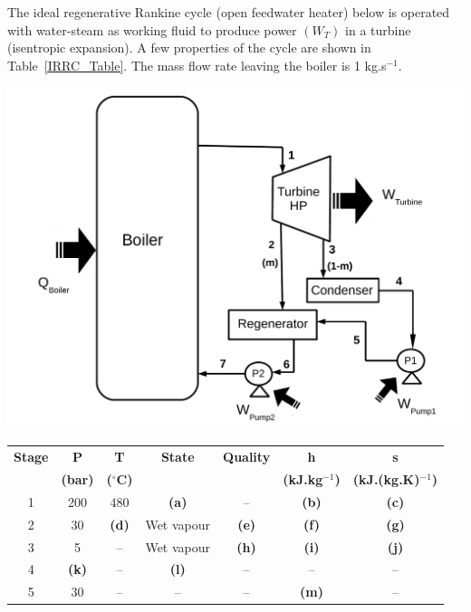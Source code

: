 \documentclass[calculator,steamtables,refrigeranttables,psychrometricchart,datasheet,resit]{exam}
\begin{document}
\begin{question}
The ideal regenerative Rankine cycle (open feedwater heater) below is operated with water-steam as working fluid to produce power $\left(W_{T}\right)$ in a turbine (isentropic expansion). A few properties of the cycle are shown in Table~\ref{IRRC_Table}. The mass flow rate leaving the boiler is 1 kg.s$^{-1}$.
      \begin{center}
      \includegraphics[width=10.cm,clip]{./Pics/Exam_Reheat_Regenerative2_Rankine_Cycle}
     \end{center} 
\begin{table}[b]
\begin{center}
\begin{tabular}{c | c c c c c c} 
\hline
{\bf Stage} & {\bf P}       & {\bf T}            &  {\bf State}  &  {\bf Quality}  & {\bf h}             & {\bf s}                  \\
            & {\bf (bar)}   & {\bf ($^{\circ}$C)} &               &                 &{\bf (kJ.kg$^{-1}$)}  & {\bf (kJ.(kg.K)$^{-1}$)}  \\
\hline
1           &  200          & 480                &  {\bf (a)}    &   --            & {\bf (b)}           & {\bf (c)}                 \\
2           &  30           & {\bf (d)}          &  Wet vapour   & {\bf (e)}       & {\bf (f)}           & {\bf (g)}                \\
3           &  5            & --                 &  Wet vapour   & {\bf (h)}       & {\bf (i)}           & {\bf (j)}                \\
4           &  {\bf (k)}    &  --                &  {\bf (l)}    & --              &   --                &   --                      \\
5           &  30           &  --                &   --          &  --             & {\bf (m)}           &  --                       \\

\end{tabular}
\end{center}
\end{table}
\end{question}
\end{document}
